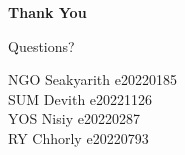 \documentclass[aspectratio=169]{beamer}
\begin{document}
\begin{frame}[plain]
\begin{center}
\vspace{1.8cm}
{\Huge \bfseries Thank You}

\vspace{0.8cm}
{\Large Questions?}

\vspace{1.0cm}
{\large NGO Seakyarith \quad e20220185}\\
{\large SUM Devith \quad e20221126}\\
{\large YOS Nisiy \quad e20220287}\\
{\large RY Chhorly \quad e20220793}
\end{center}
\end{frame}
\end{document}
